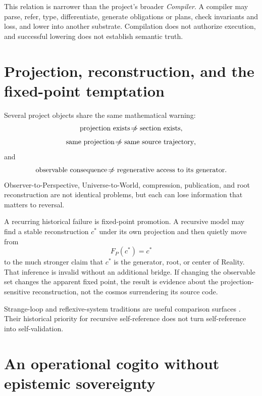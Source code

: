 \documentclass[11pt]{article}
\newcommand{\nrightarrowbyitself}{\mathrel{\not\!\Rightarrow}}
\begin{document}
This relation is narrower than the project's broader \emph{Compiler}. A compiler may parse, refer, type, differentiate, generate obligations or plans, check invariants and loss, and lower into another substrate. Compilation does not authorize execution, and successful lowering does not establish semantic truth.

\section{Projection, reconstruction, and the fixed-point temptation}

Several project objects share the same mathematical warning:
\begin{equation}
\text{projection exists}\nrightarrowbyitself\text{section exists},
\end{equation}
\begin{equation}
\text{same projection}\nrightarrowbyitself\text{same source trajectory},
\end{equation}
and
\begin{equation}
\text{observable consequence}\nrightarrowbyitself\text{regenerative access to its generator}.
\end{equation}
Observer-to-Perspective, Universe-to-World, compression, publication, and root reconstruction are not identical problems, but each can lose information that matters to reversal.

A recurring historical failure is fixed-point promotion. A recursive model may find a stable reconstruction $c^*$ under its own projection and then quietly move from
\begin{equation}
F_P(c^*)=c^*
\end{equation}
to the much stronger claim that $c^*$ is the generator, root, or center of Reality. That inference is invalid without an additional bridge. If changing the observable set changes the apparent fixed point, the result is evidence about the projection-sensitive reconstruction, not the cosmos surrendering its source code.

Strange-loop and reflexive-system traditions are useful comparison surfaces \cite{Hofstadter2007StrangeLoop,Luhmann2006Difference}. Their historical priority for recursive self-reference does not turn self-reference into self-validation.

\section{An operational cogito without epistemic sovereignty}
\end{document}
